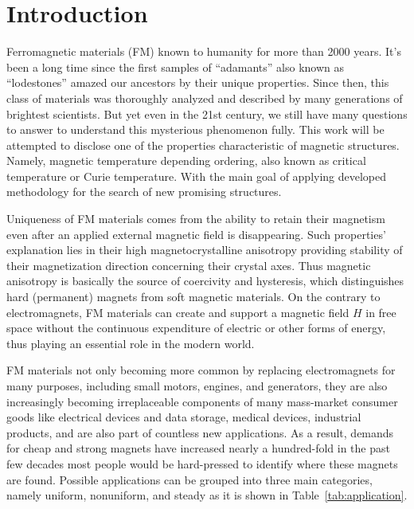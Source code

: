 \chapter{Introduction}

Ferromagnetic materials (FM) known to humanity for more than 2000 years. It's been a long time since the first samples of “adamants” also known as “lodestones” amazed our ancestors by their unique properties. Since then, this class of materials was thoroughly analyzed and described by many generations of brightest scientists. But yet even in the 21st century, we still have many questions to answer to understand this mysterious phenomenon fully. This work will be attempted to disclose one of the properties characteristic of magnetic structures. Namely, magnetic temperature depending ordering, also known as critical temperature or Curie temperature. With the main goal of applying developed methodology for the search of new promising structures.


Uniqueness of FM materials comes from the ability to retain their magnetism even after an applied external magnetic field is disappearing.
Such properties' explanation lies in their high magnetocrystalline anisotropy providing stability of their magnetization direction concerning their crystal axes. 
Thus magnetic anisotropy is basically the source of coercivity and hysteresis, which distinguishes hard (permanent) magnets from soft magnetic materials.
On the contrary to electromagnets, FM materials can create and support a magnetic field $H$ in free space without the continuous expenditure of electric or other forms of energy, thus playing an essential role in the modern world.

FM materials not only becoming more common by replacing electromagnets for many purposes, including small motors, engines, and generators, they are also increasingly becoming irreplaceable components of many mass-market consumer goods like electrical devices and data storage, medical devices, industrial products, and are also part of countless new applications.
As a result, demands for cheap and strong magnets have increased nearly a hundred-fold in the past few decades most people would be hard-pressed to identify where these magnets are found.
Possible applications can be grouped into three main categories, namely uniform, nonuniform, and steady as it is shown in Table~\ref{tab:application}.

